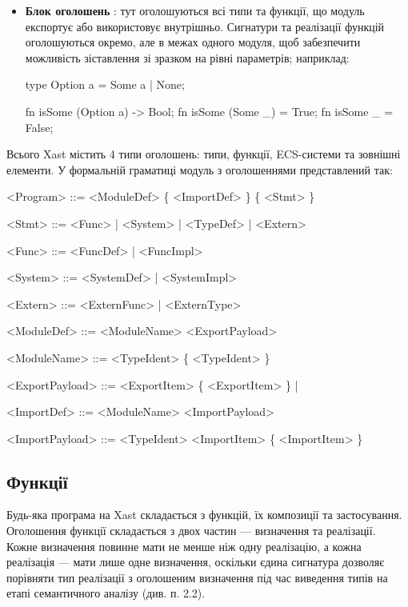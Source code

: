 \begin{itemize}
    \item \textbf{Блок оголошень} : тут оголошуються всі типи та функції, що модуль експортує або використовує внутрішньо. Сигнатури та реалізації функцій оголошуються окремо, але в межах одного модуля, щоб забезпечити можливість зіставлення зі зразком  на рівні параметрів; наприклад:
    
    \begin{xastcode}
type Option a = Some a | None;

fn isSome (Option a) -> Bool;
fn isSome (Some _) = True;
fn isSome _ = False;
    \end{xastcode}
\end{itemize}

Всього Xast містить 4 типи оголошень: типи, функції, ECS-системи та зовнішні  елементи. У формальній граматиці модуль з оголошеннями представлений так:

\begin{grammar}
<Program> ::= <ModuleDef> \{ <ImportDef> \} \{ <Stmt> \}

<Stmt> ::= <Func> | <System> | <TypeDef> | <Extern>

<Func> ::= <FuncDef> | <FuncImpl>

<System> ::= <SystemDef> | <SystemImpl>

<Extern> ::= <ExternFunc> | <ExternType>

<ModuleDef> ::=  <ModuleName>  <ExportPayload>

<ModuleName> ::= <TypeIdent> \{  <TypeIdent> \}

<ExportPayload> ::= \lit{\{} <ExportItem> \{ \lit{,} <ExportItem> \} \lit{\}}
| \lit{*}

<ImportDef> ::=  <ModuleName> <ImportPayload>

<ImportPayload> ::=  <TypeIdent>
  \alt \lit{\{} <ImportItem> \{ \lit{,} <ImportItem> \} \lit{\}}
  \alt \lit{*}
\end{grammar}

\subsection{Функції}

Будь-яка програма на Xast складається з функцій, їх композиції та застосування. Оголошення функції складається з двох частин --- визначення та реалізації. Кожне визначення повинне мати не менше ніж одну реалізацію, а кожна реалізація --- мати лише одне визначення, оскільки єдина сигнатура дозволяє порівняти тип реалізації з оголошеним визначення під час виведення типів на етапі семантичного аналізу (див. п. 2.2).

